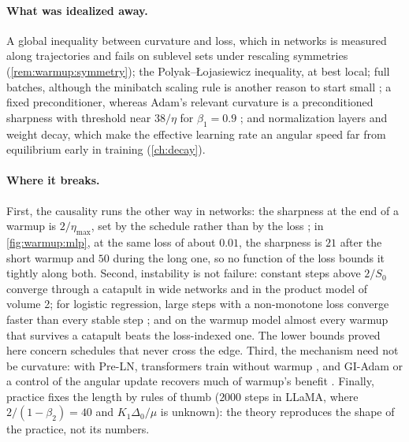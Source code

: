\begin{refsection}
\paragraph{What was idealized away.} A global inequality between curvature and loss, which in networks is measured along trajectories and fails on sublevel sets under rescaling symmetries (\cref{rem:warmup:symmetry}); the Polyak--Łojasiewicz inequality, at best local; full batches, although the minibatch scaling rule is another reason to start small \parencite{GoyalEtAl2017}; a fixed preconditioner, whereas Adam's relevant curvature is a preconditioned sharpness with threshold near $38/\eta$ for $\beta_1=0.9$ \parencite{CohenEtAl2022}; and normalization layers and weight decay, which make the effective learning rate an angular speed far from equilibrium early in training (\cref{ch:decay}).

\paragraph{Where it breaks.} First, the causality runs the other way in networks: the sharpness at the end of a warmup is $2/\eta_{\max}$, set by the schedule rather than by the loss \parencite{CohenEtAl2021,KalraBarkeshli2024}; in \cref{fig:warmup:mlp}, at the same loss of about $0.01$, the sharpness is $21$ after the short warmup and $50$ during the long one, so no function of the loss bounds it tightly along both. Second, instability is not failure: constant steps above $2/S_0$ converge through a catapult in wide networks \parencite{LewkowyczEtAl2020} and in the product model of volume 2; for logistic regression, large steps with a non-monotone loss converge faster than every stable step \parencite{WuEtAl2024}; and on the warmup model almost every warmup that survives a catapult beats the loss-indexed one. The lower bounds proved here concern schedules that never cross the edge. Third, the mechanism need not be curvature: with Pre-LN, transformers train without warmup \parencite{XiongEtAl2020}, and GI-Adam or a control of the angular update recovers much of warmup's benefit \parencite{KalraBarkeshli2024,KossonMessmerJaggi2024}. Finally, practice fixes the length by rules of thumb ($2000$ steps in LLaMA, where $2/(1-\beta_2)=40$ and $K_1\Delta_0/\mu$ is unknown): the theory reproduces the shape of the practice, not its numbers.


\end{refsection}
